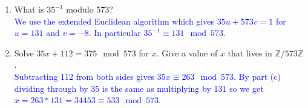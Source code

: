 \documentclass[11pt]{article}
\newcommand{\bZ}{\mathbb{Z}}
\begin{document}
\begin{enumerate}
{\begin{enumerate}
{    Solve $4x = 11 \mod 15$ for $x$.  Give a value of $x$ that lives in $\bZ/15\bZ$.
    }\\
    \textcolor{blue}{We multiple both sides of the equation by $4^{-1}$, which by part (a) is 4.  This gives $x = 44\equiv 14\mod 15$.}
    \item{
    What is $35^{-1}$ modulo 573?
    }\\
    \textcolor{blue}{We use the extended Euclidean algorithm which gives $35u+573v = 1$ for $u = 131$ and $v = -8$.  In particular $35^{-1}\equiv 131\mod 573$.}
    \item{
    Solve $35x + 112 = 375\mod 573$ for $x$.  Give a value of $x$ that lives in $\bZ/573\bZ$.
    }\\
    \textcolor{blue}{
    Subtracting 112 from both sides gives $35x\equiv 263\mod 573$.  By part (c) dividing through by 35 is the same as multiplying by 131 so we get $x = 263*131 = 34453\equiv533\mod 573$.
    }
  \end{enumerate}
  }
\end{enumerate}
\end{document}
